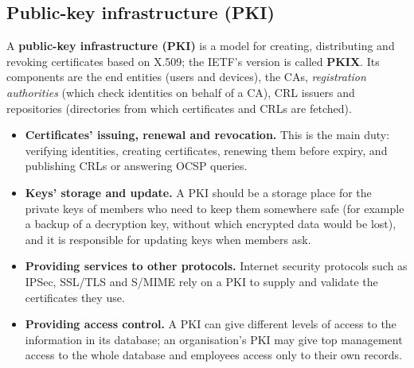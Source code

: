\subsection{Public-key infrastructure (PKI) \new}

A \textbf{public-key infrastructure (PKI)} is a model for creating, distributing and revoking certificates based on X.509; the IETF's version is called \textbf{PKIX}. Its components are the end entities (users and devices), the CAs, \emph{registration authorities} (which check identities on behalf of a CA), CRL issuers and repositories (directories from which certificates and CRLs are fetched).
\begin{center}
\end{center}
\begin{itemize}
  \item \textbf{Certificates' issuing, renewal and revocation.} This is the main duty: verifying identities, creating certificates, renewing them before expiry, and publishing CRLs or answering OCSP queries.
  \item \textbf{Keys' storage and update.} A PKI should be a storage place for the private keys of members who need to keep them somewhere safe (for example a backup of a decryption key, without which encrypted data would be lost), and it is responsible for updating keys when members ask.
  \item \textbf{Providing services to other protocols.} Internet security protocols such as IPSec, SSL/TLS and S/MIME rely on a PKI to supply and validate the certificates they use.
  \item \textbf{Providing access control.} A PKI can give different levels of access to the information in its database; an organisation's PKI may give top management access to the whole database and employees access only to their own records.
\end{itemize}

